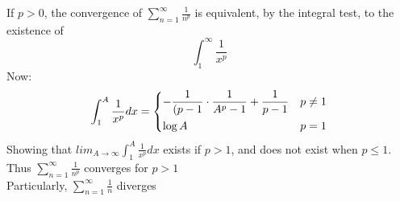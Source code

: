 \begin{eg}
    If $p>0$, the convergence of $\sum_{n=1}^\infty\frac{1}{n^p}$ is equivalent, by the integral test, to the existence of 
    $$\int_1^\infty \frac{1}{x^p}$$ \newpage
    Now:
    $$ \int_1^A \frac{1}{x^p}dx = 
    \begin{dcases}
        -\frac{1}{(p-1}\cdot \frac{1}{A^p-1}+\frac{1}{p-1} & p \neq 1 \\
        \log A & p =1
    \end{dcases} $$
    Showing that $lim_{A\to\infty} \int_1^A \frac{1}{x^p}dx$ exists if $p>1$, and does not exist when $p\leq 1$. Thus $\sum_{n=1}^\infty\frac{1}{n^p}$ converges for $p>1$ \\
    Particularly, $\sum_{n=1}^\infty\frac{1}{n}$ diverges
\end{eg}


